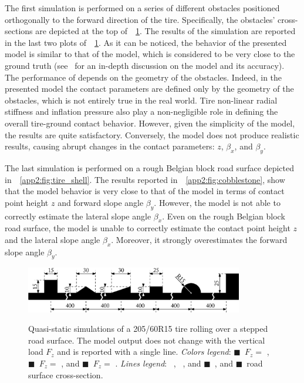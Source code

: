 The first simulation is performed on a series of different obstacles positioned orthogonally to the forward direction of the tire. Specifically, the obstacles' cross-sections are depicted at the top of~\figurename{}~\ref{app2:fig:steps}. The results of the simulation are reported in the last two plots of~\figurename{}~\ref{app2:fig:steps}. As it can be noticed, the behavior of the presented model is similar to that of the \Swift{} model, which is considered to be very close to the ground truth (see~\cite{schmeitz2004semiempirical} for an in-depth discussion on the \Swift{} model and its accuracy). The performance of \Enve{} depends on the geometry of the obstacles. Indeed, in the presented model the contact parameters are defined only by the geometry of the obstacles, which is not entirely true in the real world. Tire non-linear radial stiffness and inflation pressure also play a non-negligible role in defining the overall tire-ground contact behavior. However, given the simplicity of the model, the results are quite satisfactory. Conversely, the \TMEasy{} model does not produce realistic results, causing abrupt changes in the contact parameters: $z$, $\beta_x$, and $\beta_y$.

The last simulation is performed on a rough Belgian block road surface depicted in~\figurename{}~\ref{app2:fig:tire_shell}. The results reported in~\figurename{}~\ref{app2:fig:cobblestone}, show that the \Enve{} model behavior is very close to that of the \Swift{} model in terms of contact point height $z$ and forward slope angle $\beta_y$. However, the \Enve{} model is not able to correctly estimate the lateral slope angle $\beta_x$. Even on the rough Belgian block road surface, the \TMEasy{} model is unable to correctly estimate the contact point height $z$ and the lateral slope angle $\beta_x$. Moreover, it strongly overestimates the forward slope angle $\beta_y$.

\begin{figure}[htb]
  \centering
  \hspace{1.5cm}\includegraphics[width=9.5cm]{./figures/appendix_2/steps_ipe}\\[0.1in]
  \caption{Quasi-static simulations of a 205/60R15 tire rolling over a stepped road surface. The \TMEasy{} model output does not change with the vertical load $F_z$ and is reported with a single line. \emph{Colors legend}: {\color{mycolor1}$\blacksquare$}~$F_z =$ , {\color{mycolor2}$\blacksquare$}~$F_z =$ , and {\color{mycolor3}$\blacksquare$}~$F_z =$ . \emph{Lines legend}: \raisebox{1.0pt}{\textbf{---}}~\Enve{}, \raisebox{1.0pt}{\textbf{--~--}}~\Swift{}, and {\color{mycolor5}$\blacksquare$}~\TMEasy{}, and {\color{black}$\blacksquare$}~road surface cross-section.}
  \label{app2:fig:steps}
\end{figure}

